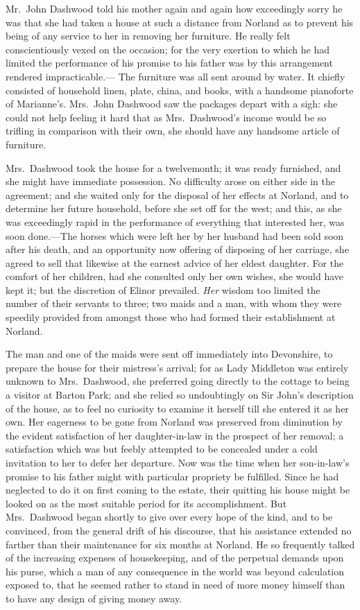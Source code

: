 Mr.\ John Dashwood told his mother again and again
how exceedingly sorry he was that she had taken a house at
such a distance from Norland as to prevent his being of any
service to her in removing her furniture.  He really felt
conscientiously vexed on the occasion; for the very exertion
to which he had limited the performance of his promise to
his father was by this arrangement rendered impracticable.---%
The furniture was all sent around by water.  It chiefly
consisted of household linen, plate, china, and books,
with a handsome pianoforte of Marianne's.  Mrs.\ John
Dashwood saw the packages depart with a sigh: she could
not help feeling it hard that as Mrs.\ Dashwood's income
would be so trifling in comparison with their own,
she should have any handsome article of furniture.

Mrs.\ Dashwood took the house for a twelvemonth; it was
ready furnished, and she might have immediate possession.
No difficulty arose on either side in the agreement; and she
waited only for the disposal of her effects at Norland,
and to determine her future household, before she set
off for the west; and this, as she was exceedingly rapid
in the performance of everything that interested her,
was soon done.---The horses which were left her by her husband
had been sold soon after his death, and an opportunity
now offering of disposing of her carriage, she agreed
to sell that likewise at the earnest advice of her
eldest daughter.  For the comfort of her children, had she
consulted only her own wishes, she would have kept it;
but the discretion of Elinor prevailed.  \emph{Her} wisdom
too limited the number of their servants to three;
two maids and a man, with whom they were speedily provided
from amongst those who had formed their establishment
at Norland.

The man and one of the maids were sent off immediately
into Devonshire, to prepare the house for their mistress's
arrival; for as Lady Middleton was entirely unknown
to Mrs.\ Dashwood, she preferred going directly to the
cottage to being a visitor at Barton Park; and she relied
so undoubtingly on Sir John's description of the house,
as to feel no curiosity to examine it herself till she
entered it as her own.  Her eagerness to be gone from Norland
was preserved from diminution by the evident satisfaction
of her daughter-in-law in the prospect of her removal;
a satisfaction which was but feebly attempted to be concealed
under a cold invitation to her to defer her departure.
Now was the time when her son-in-law's promise to his
father might with particular propriety be fulfilled.
Since he had neglected to do it on first coming to
the estate, their quitting his house might be looked
on as the most suitable period for its accomplishment.
But Mrs.\ Dashwood began shortly to give over every
hope of the kind, and to be convinced, from the general
drift of his discourse, that his assistance extended no
farther than their maintenance for six months at Norland.
He so frequently talked of the increasing expenses
of housekeeping, and of the perpetual demands upon his purse,
which a man of any consequence in the world was beyond
calculation exposed to, that he seemed rather to stand
in need of more money himself than to have any design of
giving money away.


